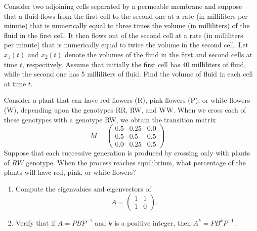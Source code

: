 \documentclass[12pt]{article}
\theoremstyle{remark}
\newtheorem*{solution}{Solution}
\newcommand{\inv}{^{-1}}
\renewcommand{\=}{&=&}
\newcommand{\<}{\langle}
\renewcommand{\>}{\rangle}
\newcommand{\bmat}{\begin{pmatrix}}
\newcommand{\emat}{\end{pmatrix}}
\begin{document}
\begin{problems}
\item
Consider two adjoining cells separated by a permeable membrane and suppose that a fluid
flows from the first cell to the second one at a rate (in milliliters per minute) that is numerically
equal to three times the volume (in milliliters) of the fluid in the first cell. It then flows out of
the second cell at a rate (in milliliters per minute) that is numerically equal to twice the volume
in the second cell. Let $x_1(t)$ and $x_2(t)$ denote the volumes of the fluid in the first and
second cells at time $t$, respectively. Assume that initially the first cell has 40 milliliters of
fluid, while the second one has 5 milliliters of fluid. Find the volume of fluid in each cell at
time $t$.

	



\item
Consider a plant that can have red flowers (R), pink flowers (P), or white flowers (W),
depending upon the genotypes RR, RW, and WW. When we cross each of these genotypes
with a genotype RW, we obtain the transition matrix
$$M=\bmat 0.5 & 0.25 & 0.0 \\ 0.5 & 0.5 & 0.5 \\ 0.0 & 0.25 & 0.5 \emat.$$
Suppose that each successive generation is produced by crossing only with plants of $RW$
genotype. When the process reaches equilibrium, what percentage of the plants will have 
red, pink, or white flowers?

	



\item
\begin{enumerate}
	\item Compute the eigenvalues and eigenvectors of $$A = \bmat 1 & 1 \\ 1 & 0 \emat.$$
	
	
	\item Verify that if $A = PBP\inv$ and $k$ is a positive integer, then $A^k = PB^kP\inv$.
	

\end{enumerate}
\end{problems}
\end{document}
